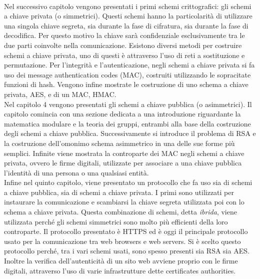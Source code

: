 \\
Nel successivo capitolo vengono presentati i primi schemi crittografici: gli schemi a chiave privata (o simmetrici). Questi schemi hanno la particolarità di utilizzare una singola chiave segreta, sia durante la fase di cifratura, sia durante la fase di decodifica. Per questo motivo la chiave sarà confidenziale esclusivamente tra le due parti coinvolte nella comunicazione. Esistono diversi metodi per costruire schemi a chiave privata, uno di questi è attraverso l'uso di reti a sostituzione e permutazione. Per l'integrità e l'autenticazione, negli schemi a chiave privata si fa uso dei message authentication codes (MAC), costruiti utilizzando le sopracitate funzioni di hash. Vengono infine mostrate le costruzione di uno schema a chiave privata, AES, e di un MAC, HMAC.
\\
Nel capitolo 4 vengono presentati gli schemi a chiave pubblica (o asimmetrici). Il capitolo comincia con una sezione dedicata a una introduzione riguardante la matematica modulare e la teoria dei gruppi, entrambi alla base della costruzione degli schemi a chiave pubblica. Successivamente si introduce il problema di RSA e la costruzione dell'omonimo schema asimmetrico in una delle sue forme più semplici. Infinite viene mostrata la controparte dei MAC negli schemi a chiave privata, ovvero le firme digitali, utilizzate per associare a una chiave pubblica l'identità di una persona o una qualsiasi entità.
\\
Infine nel quinto capitolo, viene presentato un protocollo che fa uso sia di schemi a chiave pubblica, sia di schemi a chiave privata. I primi sono utilizzati per instaurare la comunicazione e scambiarsi la chiave segreta utilizzata poi con lo schema a chiave privata. Questa combinazione di schemi, detta \emph{ibrida}, viene utilizzata perché gli schemi simmetrici sono molto più efficienti della loro controparte. Il protocollo presentato è HTTPS ed è oggi il principale protocollo usato per la comunicazione tra web browsers e web servers. Si è scelto questo protocollo perché, tra i vari schemi usati, sono spesso presenti sia RSA sia AES. Inoltre la verifica dell'autenticità di un sito web avviene proprio con le firme digitali, attraverso l'uso di varie infrastrutture dette certificates authorities.
